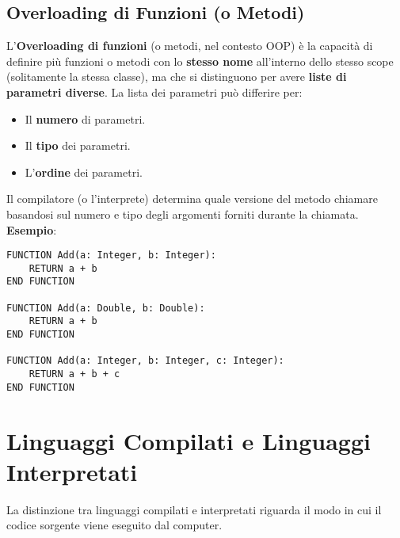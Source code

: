 \subsection{Overloading di Funzioni (o Metodi)}
L'\textbf{Overloading di funzioni} (o metodi, nel contesto OOP) è la capacità di definire più funzioni o metodi con lo \textbf{stesso nome} all'interno dello stesso scope (solitamente la stessa classe), ma che si distinguono per avere \textbf{liste di parametri diverse}. La lista dei parametri può differire per:
\begin{itemize}
    \item Il \textbf{numero} di parametri.
    \item Il \textbf{tipo} dei parametri.
    \item L'\textbf{ordine} dei parametri.
\end{itemize}
Il compilatore (o l'interprete) determina quale versione del metodo chiamare basandosi sul numero e tipo degli argomenti forniti durante la chiamata.
\textbf{Esempio}:
\begin{lstlisting}[language=Pseudocode, caption={Esempio di Function Overloading}]
FUNCTION Add(a: Integer, b: Integer):
    RETURN a + b
END FUNCTION

FUNCTION Add(a: Double, b: Double):
    RETURN a + b
END FUNCTION

FUNCTION Add(a: Integer, b: Integer, c: Integer):
    RETURN a + b + c
END FUNCTION
\end{lstlisting}

\section{Linguaggi Compilati e Linguaggi Interpretati}
La distinzione tra linguaggi compilati e interpretati riguarda il modo in cui il codice sorgente viene eseguito dal computer.

